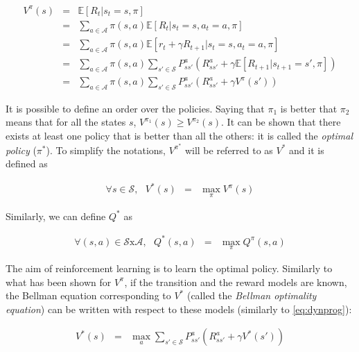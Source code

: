         \begin{eqnarray}
          	V^{\pi} (s)   & = & \mathbb{E} [R_t | s_t = s, \pi] \nonumber \\
           	& = & \sum_{a \in \mathcal{A}} \pi (s,a) \mathbb{E} [R_t | s_t = s, a_t = a, \pi] \nonumber \\
            & = & \sum_{a \in \mathcal{A}} \pi (s,a) \mathbb{E} [r_t + \gamma R_{t+1} | s_t = s, a_t = a, \pi] \nonumber \\
            & = & \sum_{a \in \mathcal{A}} \pi (s,a)  \sum_{s' \in \mathcal{S}} P_{ss'}^a (R_{ss'}^a + \gamma \mathbb{E} [R_{t+1} | s_{t+1} = s', \pi]) \nonumber \\
            & = & \sum_{a \in \mathcal{A}} \pi (s,a)  \sum_{s' \in \mathcal{S}} P_{ss'}^a (R_{ss'}^a + \gamma V^{\pi} (s')) \label{eq:dynprog}
        \end{eqnarray}
            
      	It is possible to define an order over the policies. Saying that $\pi_1$ is better that $\pi_2$ means that for all the states $s$, $V^{\pi_1} (s) \geq V^{\pi_2} (s)$. It can be shown that there exists at least one policy that is better than all the others: it is called the \textit{optimal policy} ($\pi^*$). To simplify the notations, $V^{\pi^*}$ will be referred to as $V^*$ and it is defined as
					
					\begin{eqnarray}
						\forall s \in \mathcal{S}, \text{ } V^* (s) & = & \max_\pi V^\pi (s) \label{eq:voptim}
					\end{eqnarray}
            
       	Similarly, we can define $Q^*$ as
					
					\begin{eqnarray}
						\forall (s,a) \in \mathcal{S} \text{x} \mathcal{A}, \text{ } Q^*(s,a) & = & \max_\pi Q^{\pi}(s,a) \label{eq:qoptim}
					\end{eqnarray}

        The aim of reinforcement learning is to learn the optimal policy. Similarly to what has been shown for $V^{\pi}$, if the transition and the reward models are known, the Bellman equation corresponding to $V^*$ (called the \textit{Bellman optimality equation}) can be written with respect to these models (similarly to \ref{eq:dynprog}):
								
					\begin{eqnarray}
						V^*(s) & = & \max_a \sum_{s' \in \mathcal{S}} P_{ss'}^a (R_{ss'}^a + \gamma V^*(s')) \label{eq:vbellmanoptim}
					\end{eqnarray}
        
